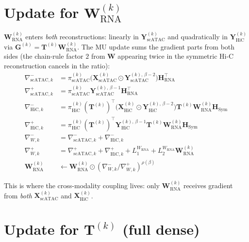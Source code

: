 \documentclass[11pt]{article}
\newcommand{\mat}[1]{\mathbf{#1}}
\newcommand{\Hada}{\odot}
\newcommand{\sci}[1]{\mathrm{#1}}
\begin{document}
\section{Update for $\mat{W}_{\sci{RNA}}^{(k)}$}\label{sec:W}

$\mat{W}_{\sci{RNA}}^{(k)}$ enters \emph{both} reconstructions: linearly in $\mat{Y}_{\sci{scATAC}}^{(k)}$ and quadratically in $\mat{Y}_{\sci{HiC}}^{(k)}$ via $\mat{G}^{(k)} = \mat{T}^{(k)} \mat{W}_{\sci{RNA}}^{(k)}$. The MU update sums the gradient parts from both sides (the chain-rule factor $2$ from $\mat{W}$ appearing twice in the symmetric Hi-C reconstruction cancels in the ratio):
\begin{align}
\nabla^-_{\sci{scATAC}, k} &= \pi_{\sci{scATAC}}^{(k)} \big( \mat{X}_{\sci{scATAC}}^{(k)} \Hada \mat{Y}_{\sci{scATAC}}^{(k),\,\beta-2} \big) \mat{H}_{\sci{RNA}}^\top \\
\nabla^+_{\sci{scATAC}, k} &= \pi_{\sci{scATAC}}^{(k)} \mat{Y}_{\sci{scATAC}}^{(k),\,\beta-1} \mat{H}_{\sci{RNA}}^\top \\[4pt]
\nabla^-_{\sci{HiC}, k} &= \pi_{\sci{HiC}}^{(k)} (\mat{T}^{(k)})^\top \big( \mat{X}_{\sci{HiC}}^{(k)} \Hada \mat{Y}_{\sci{HiC}}^{(k),\,\beta-2} \big) \mat{T}^{(k)} \mat{W}_{\sci{RNA}}^{(k)} \mat{H}_{\sci{Sym}} \\
\nabla^+_{\sci{HiC}, k} &= \pi_{\sci{HiC}}^{(k)} (\mat{T}^{(k)})^\top \mat{Y}_{\sci{HiC}}^{(k),\,\beta-1} \mat{T}^{(k)} \mat{W}_{\sci{RNA}}^{(k)} \mat{H}_{\sci{Sym}} \\[4pt]
\nabla^-_{W, k} &= \nabla^-_{\sci{scATAC}, k} + \nabla^-_{\sci{HiC}, k} \\
\nabla^+_{W, k} &= \nabla^+_{\sci{scATAC}, k} + \nabla^+_{\sci{HiC}, k} + L_1^{W_{\sci{RNA}}} + L_2^{W_{\sci{RNA}}} \mat{W}_{\sci{RNA}}^{(k)} \\[4pt]
\mat{W}_{\sci{RNA}}^{(k)} &\leftarrow \mat{W}_{\sci{RNA}}^{(k)} \Hada
                          \left( \nabla^-_{W, k} \big/ \nabla^+_{W, k} \right)^{\rho(\beta)}
\end{align}

This is where the cross-modality coupling lives: only $\mat{W}_{\sci{RNA}}^{(k)}$ receives gradient from \emph{both} $\mat{X}_{\sci{scATAC}}^{(k)}$ and $\mat{X}_{\sci{HiC}}^{(k)}$.

\section{Update for $\mat{T}^{(k)}$ (full dense)}\label{sec:T}
\end{document}
